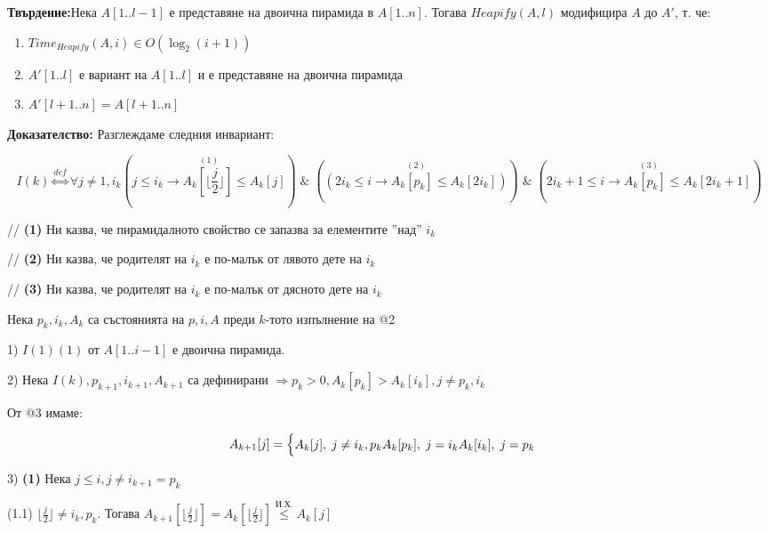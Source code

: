 \documentclass{article}
\renewcommand{\\}{\newline}
\newcommand{\amp}{\;\&\;}
\newcommand{\tv}{\textbf{Твърдение:\;}}
\newcommand{\doc}{\textbf{Доказателство: }}
\begin{document}
      \tv Нека \(A[1..l-1]\) е представяне на двоична пирамида в \(A[1..n]\). \newline
      Тогава \(Heapify(A, l)\) модифицира \(A\) до \(A'\), т. че:
      \begin{enumerate}
          \item \(Time_{Heapify}(A, i) \in O(\log_2(i+1))\)
          \item \(A'[1..l]\) е вариант на \(A[1..l]\) и е представяне на двоична пирамида 
          \item \(A'[l+1..n] = A[l+1..n]\)
      \end{enumerate}
      \doc Разглеждаме следния инвариант: 

      \[I(k) \overset{def}{\iff} \forall j \not= 1, i_k (\overset{(1)}{j \leq i_k \rightarrow A_{k}[\lfloor \frac{j}{2} \rfloor] \leq A_{k}[j]}) \amp (\overset{(2)}{(2i_k \leq i \rightarrow A_k[p_k] \leq A_k[2i_k])}) \amp (\overset{(3)}{2i_{k} + 1 \leq i \rightarrow A_{k}[p_k] \leq A_k[2i_k + 1]})\]

      // \textbf{(1)} Ни казва, че пирамидалното свойство се запазва за елементите ''над'' \(i_k\)

      // \textbf{(2)} Ни казва, че родителят на \(i_k\) е по-малък от лявото дете на \(i_k\)

      // \textbf{(3)} Ни казва, че родителят на \(i_k\) е по-малък от дясното дете на \(i_k\)

      Нека \(p_k, i_k, A_k\) са състоянията на \(p, i, A\) преди \(k\)-тото изпълнение на @2

      1) \(I(1) (1)\) от \(A[1..i-1]\) е двоична пирамида.


      2) Нека \(I(k), p_{k+1}, i_{k+1}, A_{k+1}\) са дефинирани \(\Rightarrow p_{k} > 0, A_{k}[p_k] > A_k[i_k], j \not= p_k, i_k\)

      От @3 имаме:

      \[ A_{k+1}[j] = \begin{cases}
          A_k[j],\; j \not= i_k, p_k \\
          A_k[p_k],\; j = i_k \\
          A_k[i_k], \; j = p_k
      \end{cases}\]

      3) \textbf{(1)} Нека \(j \leq i, j\not= i_{k+1} = p_k\)

      \hspace*{10mm} (1.1) \(\lfloor \frac{j}{2} \rfloor \not= i_k, p_k\). Тогава \(A_{k+1}[\lfloor\frac{j}{2}\rfloor] = A_{k}[\lfloor \frac{j}{2} \rfloor] \overset{\text{И.Х.}}{\leq} A_k[j]\)
\end{document}
